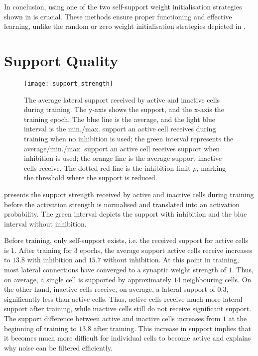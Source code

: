 In conclusion, using one of the two self-support weight initialisation strategies shown in  is crucial. These methods ensure proper functioning and effective learning, unlike the random or zero weight initialisation strategies depicted in .

\section{Support Quality}
%
\begin{figure}[h]
    \centering
    \texttt{[image: support\_strength]}
    \caption[Average lateral support]{The average lateral support received by active and inactive cells during training. The y-axis shows the support, and the x-axis the training epoch. The blue line is the average, and the light blue interval is the min./max. support an active cell receives during training when no inhibition is used; the green interval represents the average/min./max. support an active cell receives support when inhibition is used; the orange line is the average support inactive cells receive. The dotted red line is the inhibition limit $\rho$, marking the threshold where the support is reduced.}
\end{figure}
%
 presents the support strength received by active and inactive cells during training before the activation strength is normalised and translated into an activation probability.
The green interval depicts the support with inhibition and the blue interval without inhibition.

Before training, only self-support exists, i.e. the received support for active cells is $1$.
After training for $3$ epochs, the average support active cells receive increases to $13.8$ with inhibition and $15.7$ without inhibition.
At this point in training, most lateral connections have converged to a synaptic weight strength of $1$.
Thus, on average, a single cell is supported by approximately $14$ neighbouring cells.
On the other hand, inactive cells receive, on average, a lateral support of $0.3$, significantly less than active cells.
Thus, active cells receive much more lateral support after training, while inactive cells still do not receive significant support.
The support difference between active and inactive cells increases from $1$ at the beginning of training to $13.8$ after training.
This increase in support implies that it becomes much more difficult for individual cells to become active and explains why noise can be filtered efficiently.


